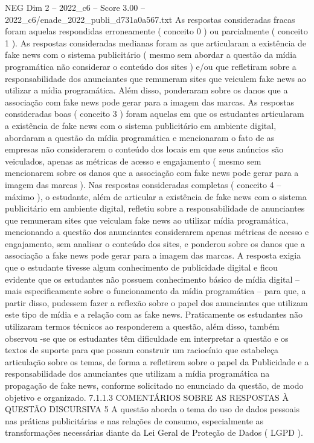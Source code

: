 \begin{textsample}{NEG Dim 2 – 2022\_c6 – Score 3.00 – 2022\_c6/enade\_2022\_publi\_d731a0a567.txt}
As respostas consideradas fracas foram aquelas respondidas erroneamente ( conceito 0 ) ou parcialmente ( conceito 1 ).
As respostas consideradas medianas foram as que articularam a existência de fake news com o sistema publicitário ( mesmo sem abordar a questão da mídia programática não considerar o conteúdo dos sites ) e/ou que refletiram sobre a responsabilidade dos anunciantes que remuneram sites que veiculem fake news ao utilizar a mídia programática.
Além disso, ponderaram sobre os danos que a associação com fake news pode gerar para a imagem das marcas.
As respostas consideradas boas ( conceito 3 ) foram aquelas em que os estudantes articularam a existência de fake news com o sistema publicitário em ambiente digital, abordaram a questão da mídia programática e mencionaram o fato de as empresas não considerarem o conteúdo dos locais em que seus anúncios são veiculados, apenas as métricas de acesso e engajamento ( mesmo sem mencionarem sobre os danos que a associação com fake news pode gerar para a imagem das marcas ).
Nas respostas consideradas completas ( conceito 4 – máximo ), o estudante, além de articular a existência de fake news com o sistema publicitário em ambiente digital, refletiu sobre a responsabilidade de anunciantes que remuneram sites que veiculam fake news ao utilizar mídia programática, mencionando a questão dos anunciantes considerarem apenas métricas de acesso e engajamento, sem analisar o conteúdo dos sites, e ponderou sobre os danos que a associação a fake news pode gerar para a imagem das marcas.
A resposta exigia que o estudante tivesse algum conhecimento de publicidade digital e ficou evidente que os estudantes não possuem conhecimento básico de mídia digital – mais especificamente sobre o funcionamento da mídia programática – para que, a partir disso, pudessem fazer a reflexão sobre o papel dos anunciantes que utilizam este tipo de mídia e a relação com as fake news.
Praticamente os estudantes não utilizaram termos técnicos ao responderem a questão, além disso, também observou -se que os estudantes têm dificuldade em interpretar a questão e os textos de suporte para que possam construir um raciocínio que estabeleça articulação sobre os temas, de forma a refletirem sobre o papel da Publicidade e a responsabilidade dos anunciantes que utilizam a mídia programática na propagação de fake news, conforme solicitado no enunciado da questão, de modo objetivo e organizado. 7.1.1.3 COMENTÁRIOS SOBRE AS RESPOSTAS À QUESTÃO DISCURSIVA 5 A questão aborda o tema do uso de dados pessoais nas práticas publicitárias e nas relações de consumo, especialmente as transformações necessárias diante da Lei Geral de Proteção de Dados ( LGPD ).

\end{textsample}
